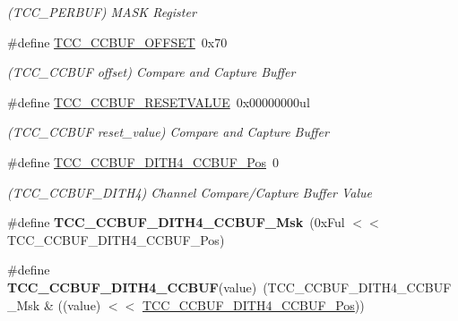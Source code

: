 \begin{DoxyCompactItemize}
\begin{DoxyCompactList}\small\item\em (T\+C\+C\+\_\+\+P\+E\+R\+B\+U\+F) M\+A\+S\+K Register \end{DoxyCompactList}\item 
\hypertarget{group___s_a_m_l21___t_c_c_ga2b35c4d290d6e2c1bc82909e60d25077}{}\#define \hyperlink{group___s_a_m_l21___t_c_c_ga2b35c4d290d6e2c1bc82909e60d25077}{T\+C\+C\+\_\+\+C\+C\+B\+U\+F\+\_\+\+O\+F\+F\+S\+E\+T}~0x70\label{group___s_a_m_l21___t_c_c_ga2b35c4d290d6e2c1bc82909e60d25077}

\begin{DoxyCompactList}\small\item\em (T\+C\+C\+\_\+\+C\+C\+B\+U\+F offset) Compare and Capture Buffer \end{DoxyCompactList}\item 
\hypertarget{group___s_a_m_l21___t_c_c_ga257c8fa8b95cd53873cf9ebe1cef6f35}{}\#define \hyperlink{group___s_a_m_l21___t_c_c_ga257c8fa8b95cd53873cf9ebe1cef6f35}{T\+C\+C\+\_\+\+C\+C\+B\+U\+F\+\_\+\+R\+E\+S\+E\+T\+V\+A\+L\+U\+E}~0x00000000ul\label{group___s_a_m_l21___t_c_c_ga257c8fa8b95cd53873cf9ebe1cef6f35}

\begin{DoxyCompactList}\small\item\em (T\+C\+C\+\_\+\+C\+C\+B\+U\+F reset\+\_\+value) Compare and Capture Buffer \end{DoxyCompactList}\item 
\hypertarget{group___s_a_m_l21___t_c_c_gac924373819678e33608b71f8957e823c}{}\#define \hyperlink{group___s_a_m_l21___t_c_c_gac924373819678e33608b71f8957e823c}{T\+C\+C\+\_\+\+C\+C\+B\+U\+F\+\_\+\+D\+I\+T\+H4\+\_\+\+C\+C\+B\+U\+F\+\_\+\+Pos}~0\label{group___s_a_m_l21___t_c_c_gac924373819678e33608b71f8957e823c}

\begin{DoxyCompactList}\small\item\em (T\+C\+C\+\_\+\+C\+C\+B\+U\+F\+\_\+\+D\+I\+T\+H4) Channel Compare/\+Capture Buffer Value \end{DoxyCompactList}\item 
\hypertarget{group___s_a_m_l21___t_c_c_ga6e181d9248bc367885ce33a9348944cb}{}\#define {\bfseries T\+C\+C\+\_\+\+C\+C\+B\+U\+F\+\_\+\+D\+I\+T\+H4\+\_\+\+C\+C\+B\+U\+F\+\_\+\+Msk}~(0x\+Ful $<$$<$ T\+C\+C\+\_\+\+C\+C\+B\+U\+F\+\_\+\+D\+I\+T\+H4\+\_\+\+C\+C\+B\+U\+F\+\_\+\+Pos)\label{group___s_a_m_l21___t_c_c_ga6e181d9248bc367885ce33a9348944cb}

\item 
\hypertarget{group___s_a_m_l21___t_c_c_gae2073c32b03d109b320ebf0cfcbae3a7}{}\#define {\bfseries T\+C\+C\+\_\+\+C\+C\+B\+U\+F\+\_\+\+D\+I\+T\+H4\+\_\+\+C\+C\+B\+U\+F}(value)~(T\+C\+C\+\_\+\+C\+C\+B\+U\+F\+\_\+\+D\+I\+T\+H4\+\_\+\+C\+C\+B\+U\+F\+\_\+\+Msk \& ((value) $<$$<$ \hyperlink{group___s_a_m_l21___t_c_c_gac924373819678e33608b71f8957e823c}{T\+C\+C\+\_\+\+C\+C\+B\+U\+F\+\_\+\+D\+I\+T\+H4\+\_\+\+C\+C\+B\+U\+F\+\_\+\+Pos}))\label{group___s_a_m_l21___t_c_c_gae2073c32b03d109b320ebf0cfcbae3a7}


\end{DoxyCompactItemize}
